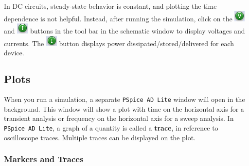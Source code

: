 \documentclass[11pt]{article}
\begin{document}
In DC circuits, steady-state behavior is constant, and plotting the
time dependence is not helpful. Instead, after running the simulation,
click on the \includegraphics{OrCAD_ShowV.png} and
\includegraphics{OrCAD_ShowI.png} buttons in the tool bar in the 
schematic window to display voltages and currents. The
\includegraphics{OrCAD_ShowI.png} button displays power
dissipated/stored/delivered for each device.

\subsection{Plots}

When you run a simulation, a separate \texttt{PSpice AD Lite} window
will open in the background. This window will show a plot with time on
the horizontal axis for a transient analysis or frequency on the
horizontal axis for a sweep analysis. In \texttt{PSpice AD Lite}, a
graph of a quantity is called a \textbf{trace}, in reference to
oscilloscope traces. Multiple traces can be displayed on the plot.

\subsubsection*{Markers and Traces}
\end{document}
